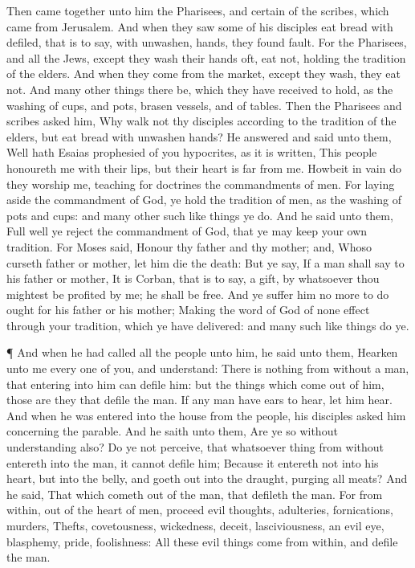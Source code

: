  Then came together unto him the Pharisees, and certain of
the scribes, which came from Jerusalem.  And when they saw
some of his disciples eat bread with defiled, that is to say, with
unwashen, hands, they found fault.  For the Pharisees, and
all the Jews, except they wash their hands oft, eat not, holding the
tradition of the elders.  And when they come from the
market, except they wash, they eat not. And many other things there be,
which they have received to hold, as the washing of cups, and pots,
brasen vessels, and of tables.  Then the Pharisees and
scribes asked him, Why walk not thy disciples according to the tradition
of the elders, but eat bread with unwashen hands?  He
answered and said unto them, Well hath Esaias prophesied of you
hypocrites, as it is written, This people honoureth me with their lips,
but their heart is far from me.  Howbeit in vain do they
worship me, teaching for doctrines the commandments of men. 
For laying aside the commandment of God, ye hold the tradition of men,
as the washing of pots and cups: and many other such like things ye do.
 And he said unto them, Full well ye reject the commandment
of God, that ye may keep your own tradition.  For Moses
said, Honour thy father and thy mother; and, Whoso curseth father or
mother, let him die the death:  But ye say, If a man shall
say to his father or mother, It is Corban, that is to say, a gift, by
whatsoever thou mightest be profited by me; he shall be free.
 And ye suffer him no more to do ought for his father or
his mother;  Making the word of God of none effect through
your tradition, which ye have delivered: and many such like things do
ye.

 ¶ And when he had called all the people unto him, he said
unto them, Hearken unto me every one of you, and understand:
 There is nothing from without a man, that entering into
him can defile him: but the things which come out of him, those are they
that defile the man.  If any man have ears to hear, let him
hear.  And when he was entered into the house from the
people, his disciples asked him concerning the parable. 
And he saith unto them, Are ye so without understanding also? Do ye not
perceive, that whatsoever thing from without entereth into the man, it
cannot defile him;  Because it entereth not into his heart,
but into the belly, and goeth out into the draught, purging all meats?
 And he said, That which cometh out of the man, that
defileth the man.  For from within, out of the heart of
men, proceed evil thoughts, adulteries, fornications, murders,
 Thefts, covetousness, wickedness, deceit, lasciviousness,
an evil eye, blasphemy, pride, foolishness:  All these evil
things come from within, and defile the man.

